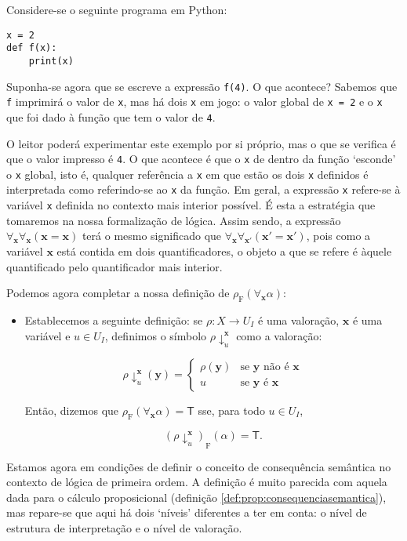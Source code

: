 \documentclass{report}
\theoremstyle{definition}
\theoremstyle{remark}
\renewcommand{\bf}[1]{\mathbf{#1}}
\newcommand{\F}{\mathrm{F}}
\newcommand{\lt}{\mathsf{T}}
\begin{document}
	Considere-se o seguinte programa em Python:
	
	\begin{lstlisting}
x = 2
def f(x):
    print(x)
	\end{lstlisting}
	Suponha-se agora que se escreve a expressão \texttt{f(4)}. O que acontece? Sabemos que \texttt{f} imprimirá o valor de \texttt{x}, mas há dois \texttt{x} em jogo: o valor global de \texttt{x = 2} e o \texttt{x} que foi dado à função que tem o valor de \texttt{4}.
	
	O leitor poderá experimentar este exemplo por si próprio, mas o que se verifica é que o valor impresso é \texttt{4}. O que acontece é que o \texttt{x} de dentro da função `esconde' o \texttt{x} global, isto é, qualquer referência a \texttt{x} em que estão os dois \texttt{x} definidos é interpretada como referindo-se ao \texttt{x} da função. Em geral, a expressão \texttt{x} refere-se à variável \texttt{x} definida no contexto mais interior possível. É esta a estratégia que tomaremos na nossa formalização de lógica. Assim sendo, a expressão $\forall_{\bf x} \forall_{\bf x} (\bf x = \bf x)$ terá o mesmo significado que $\forall_{\bf x} \forall_{\bf x'} (\bf x' = \bf x')$, pois como a variável $\bf x$ está contida em dois quantificadores, o objeto a que se refere é àquele quantificado pelo quantificador mais interior.
	
	Podemos agora completar a nossa definição de $\rho_\F(\forall_{\bf x} \alpha)$:
	
	\begin{itemize}
	\item Establecemos a seguinte definição: se $\rho : X \to U_I$ é uma valoração, $\bf x$ é uma variável e $u \in U_I$, definimos o símbolo $\rho\!\downarrow^{\bf x}_u$ como a valoração:
	
	\[\rho\!\downarrow^{\bf x}_u (\bf y) = \begin{cases}
	\rho(\bf y) & \text{se $\bf y$ não é $\bf x$}\\
	u & \text{se $\bf y$ é $\bf x$}
	\end{cases}\]
	
	Então, dizemos que $\rho_\F(\forall_{\bf x} \alpha) = \lt$ sse, para todo $u \in U_I$,
	
	\[(\rho\!\downarrow^{\bf x}_u)_\F(\alpha) = \lt.\]
	\end{itemize}
	
	Estamos agora em condições de definir o conceito de consequência semântica no contexto de lógica de primeira ordem. A definição é muito parecida com aquela dada para o cálculo proposicional (definição \ref{def:prop:consequenciasemantica}), mas repare-se que aqui há dois `níveis' diferentes a ter em conta: o nível de estrutura de interpretação e o nível de valoração.
	
\end{document}
